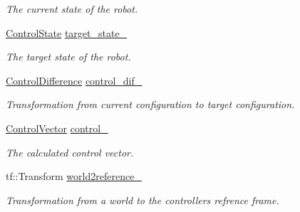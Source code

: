 \begin{DoxyCompactItemize}
\begin{DoxyCompactList}\small\item\em The current state of the robot. \end{DoxyCompactList}\item 
\hyperlink{structController_1_1ControlState}{Control\+State} \hyperlink{classController_a8412c8448970cf820f932cff02d69d33}{target\+\_\+state\+\_\+}\hypertarget{classController_a8412c8448970cf820f932cff02d69d33}{}\label{classController_a8412c8448970cf820f932cff02d69d33}

\begin{DoxyCompactList}\small\item\em The target state of the robot. \end{DoxyCompactList}\item 
\hyperlink{classController_a75a1e2f93842f65d1263f7d3c2fd8898}{Control\+Difference} \hyperlink{classController_afe3b54c59a80046661f0030a573539d7}{control\+\_\+dif\+\_\+}\hypertarget{classController_afe3b54c59a80046661f0030a573539d7}{}\label{classController_afe3b54c59a80046661f0030a573539d7}

\begin{DoxyCompactList}\small\item\em Transformation from current configuration to target configuration. \end{DoxyCompactList}\item 
\hyperlink{structController_1_1ControlVector}{Control\+Vector} \hyperlink{classController_aaafcd892e9e6080e839a1348a7ef40db}{control\+\_\+}\hypertarget{classController_aaafcd892e9e6080e839a1348a7ef40db}{}\label{classController_aaafcd892e9e6080e839a1348a7ef40db}

\begin{DoxyCompactList}\small\item\em The calculated control vector. \end{DoxyCompactList}\item 
tf\+::\+Transform \hyperlink{classController_aa713beca2ef8152d273bbc6fc38f7fc8}{world2reference\+\_\+}\hypertarget{classController_aa713beca2ef8152d273bbc6fc38f7fc8}{}\label{classController_aa713beca2ef8152d273bbc6fc38f7fc8}

\begin{DoxyCompactList}\small\item\em Transformation from a world to the controllers refrence frame. \end{DoxyCompactList}\end{DoxyCompactItemize}
